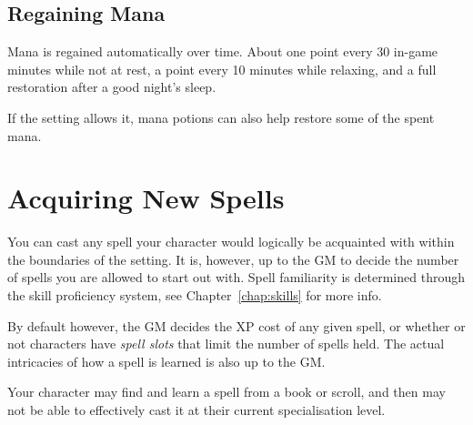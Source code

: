 \subsection{Regaining Mana}
Mana is regained automatically over time.
About one point every 30 in-game minutes while not at rest,
a point every 10 minutes while relaxing,
and a full restoration after a good night's sleep.

If the setting allows it, mana potions can also help restore some of the spent mana.

\section{Acquiring New Spells}
You can cast any spell your character would logically be acquainted with within the boundaries of the setting.
It is, however, up to the GM to decide the number of spells you are allowed to start out with.
Spell familiarity is determined through the skill proficiency system, see Chapter~\ref{chap:skills} for more info.

By default however, the GM decides the XP cost of any given spell, or whether or not characters have \textit{spell slots} that limit the number of spells held. 
The actual intricacies of how a spell is learned is also up to the GM.

\begin{note} 
  Your character may find and learn a spell from a book or scroll, and then may not be able to effectively cast it at their current specialisation level.
\end{note}